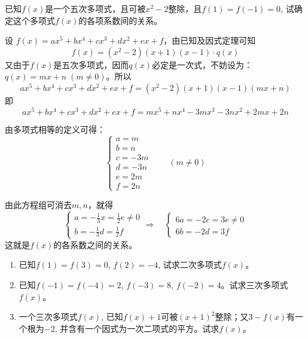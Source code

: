 \begin{example}
已知$f(x)$是一个五次多项式，且可被$x^2-2$整除，且$f(1)=f(-1)=0$, 试确定这个多项式$f(x)$的各项系数间的关系。
\end{example}

\begin{solution}
设 $f(x)=ax^5+bx^4+cx^3+dx^2+ex+f$，由已知及因式定理可知
\[f (x) = (x^2-2) (x+1)(x-1)\cdot q(x)\]
又由于$f(x)$是五次多项式，因而$q(x)$必定是一次式，不妨设为：$q(x)=mx+n\; (m\ne 0)$。所以
\[ax^5+bx^4+cx^3+dx^2+ex+f= (x^2-2) (x+1)(x-1)(mx+n)\] 
即
\[ax^5+bx^4+cx^3+dx^2+ex+f= mx^5+nx^4-3mx^3-3nx^2+2mx+2n\] 

由多项式相等的定义可得：
\[\begin{cases}
    a=m\\
    b=n\\
    c=-3m\\
    d=-3n\\
    e=2m\\
    f=2n
\end{cases}\qquad (m\ne 0)\]

由此方程组可消去$m,n$，就得
\[\begin{cases}
    a=-\frac{1}{3}x=\frac{1}{2}e\ne 0\\
    b=-\frac{1}{3}d=\frac{1}{2}f
\end{cases}\Rightarrow\quad \begin{cases}
    6a=-2c=3e\ne 0\\
    6b=-2d=3f
\end{cases}\]
这就是$f(x)$的各系数之间的关系。
\end{solution}

\begin{ex}
\begin{enumerate}
    \item 已知$f(1)=f(3)=0$, $f(2)=-4$, 试求二次多项式$f (x)$。
    \item 已知$f(-1)=f(-4)=2$, $f(-3)=8$, $f(-2)=4$。试求三次多项式$f(x)$。
    \item 一个三次多项式$f(x)$, 已知$f(x)+1$可被$(x+1)^2$整除；又$3-f(x)$有一个根为$-2$, 并含有一个因式为一次二项式的平方。试求$f(x)$。
\end{enumerate}
\end{ex}

